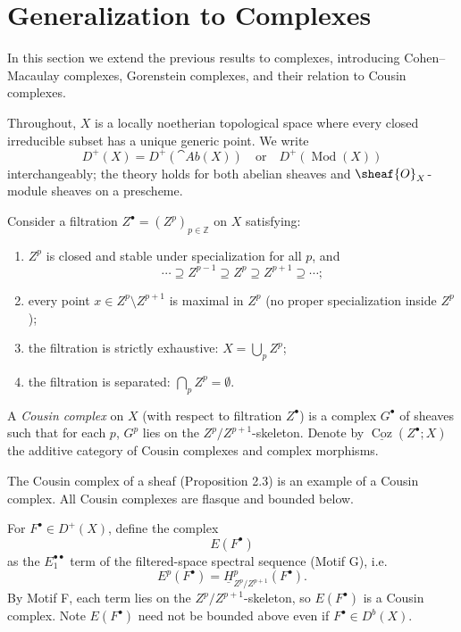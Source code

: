 
\setcounter{page}{240}
\section{Generalization to Complexes}

In this section we extend the previous results to complexes, introducing Cohen--Macaulay complexes, Gorenstein complexes, and their relation to Cousin complexes.

Throughout, \(X\) is a locally noetherian topological space where every closed irreducible subset has a unique generic point. We write
\[
D^+(X) = D^+(\cat{Ab}(X)) \quad\text{or}\quad D^+(\operatorname{Mod}(X))
\]
interchangeably; the theory holds for both abelian sheaves and \(\sheaf{O}_X\)-module sheaves on a prescheme.

Consider a filtration \(Z^\bullet = (Z^p)_{p\in\mathbb{Z}}\) on \(X\) satisfying:
\begin{enumerate}
\item \(Z^p\) is closed and stable under specialization for all \(p\), and
\[
\cdots \supseteq Z^{p-1} \supseteq Z^p \supseteq Z^{p+1} \supseteq \cdots;
\]
\item every point \(x\in Z^p\setminus Z^{p+1}\) is maximal in \(Z^p\) (no proper specialization inside \(Z^p\));
\item the filtration is strictly exhaustive: \(X = \bigcup_{p} Z^p\);
\item the filtration is separated: \(\displaystyle\bigcap_{p} Z^p = \emptyset\).
\end{enumerate}

\setcounter{page}{241}
\begin{definition}
A \textit{Cousin complex} on \(X\) (with respect to filtration \(Z^\bullet\)) is a complex \(G^\bullet\) of sheaves such that for each \(p\), \(G^p\) lies on the \(Z^p/Z^{p+1}\)-skeleton.
Denote by \(\underline{\operatorname{Coz}}(Z^\bullet;X)\) the additive category of Cousin complexes and complex morphisms.
\end{definition}

\begin{remark}
The Cousin complex of a sheaf (Proposition 2.3) is an example of a Cousin complex. All Cousin complexes are flasque and bounded below.
\end{remark}

\begin{definition}
For \(F^\bullet\in D^+(X)\), define the complex
\[
E(F^\bullet)
\]
as the \(E_1^{\bullet\bullet}\) term of the filtered-space spectral sequence (Motif G), i.e.
\[
E^p(F^\bullet) = \underline{H}_{Z^p/Z^{p+1}}^p(F^\bullet).
\]
By Motif F, each term lies on the \(Z^p/Z^{p+1}\)-skeleton, so \(E(F^\bullet)\) is a Cousin complex. Note \(E(F^\bullet)\) need not be bounded above even if \(F^\bullet\in D^b(X)\).
\end{definition}

